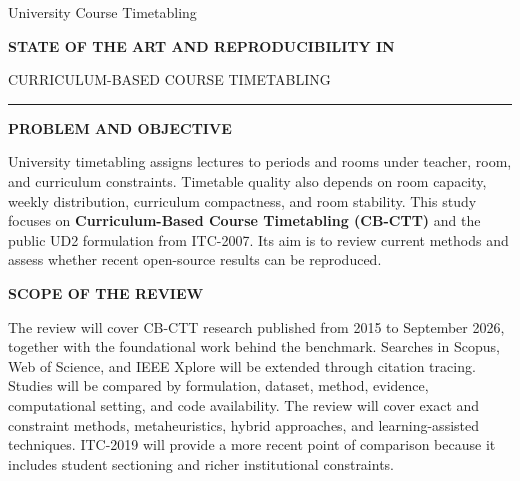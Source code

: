 \documentclass[10pt]{article}
\newcommand{\proposalheading}[1]{%
  \vspace{1.8mm}%
  {\color{wine}\sffamily\fontsize{9.8}{11.2}\selectfont\bfseries
  \MakeUppercase{#1}}\par
  \vspace{0.55mm}%
}
\begin{document}
\AddToShipoutPictureBG*{%
  \AtPageUpperLeft{\raisebox{-\height}{\color{wine}\rule{\paperwidth}{4mm}}}%
}

\begin{minipage}[t][0.98\textheight][t]{\textwidth}
\vspace{3.5mm}

\begin{center}
  {\fontsize{24}{27}\selectfont University Course Timetabling\par}
  \vspace{2.0mm}
  {\color{muted}\sffamily\fontsize{8.8}{10.2}\selectfont\bfseries
  STATE OF THE ART AND REPRODUCIBILITY IN\par
  CURRICULUM-BASED COURSE TIMETABLING\par}
  \vspace{2.0mm}
  {\color{wine}\rule{36mm}{0.8pt}}
\end{center}

\proposalheading{Problem and objective}
{\fontsize{9.4}{11.2}\selectfont\justifying
University timetabling assigns lectures to periods and rooms under teacher, room, and curriculum constraints. Timetable quality also depends on room capacity, weekly distribution, curriculum compactness, and room stability. This study focuses on \textbf{Curriculum-Based Course Timetabling (CB-CTT)} and the public UD2 formulation from ITC-2007. Its aim is to review current methods and assess whether recent open-source results can be reproduced.\par}

\proposalheading{Scope of the review}
{\fontsize{9.2}{11}\selectfont\justifying
The review will cover CB-CTT research published from 2015 to September 2026, together with the foundational work behind the benchmark. Searches in Scopus, Web of Science, and IEEE Xplore will be extended through citation tracing. Studies will be compared by formulation, dataset, method, evidence, computational setting, and code availability. The review will cover exact and constraint methods, metaheuristics, hybrid approaches, and learning-assisted techniques. ITC-2019 will provide a more recent point of comparison because it includes student sectioning and richer institutional constraints.\par}


\end{minipage}
\end{document}
